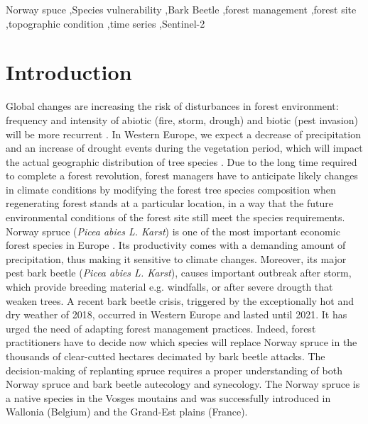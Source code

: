 \documentclass[3p,procedia]{elsarticle}
\begin{document}
\begin{frontmatter}
\begin{abstract}
\fi
\end{abstract}

\begin{keyword}
  Norway spuce \sep Species vulnerability \sep Bark Beetle \sep forest management \sep forest site \sep topographic condition \sep time series \sep Sentinel-2
\end{keyword}

\end{frontmatter}

\linenumbers

\section{Introduction}

Global changes are increasing the risk of disturbances in forest environment: frequency and intensity of abiotic (fire, storm, drough) and biotic (pest invasion) will be more recurrent \citep{lindner_climate_2010}.
In Western Europe, we expect a decrease of precipitation and an increase of drought events during the vegetation period, which will impact the actual geographic distribution of tree species \citep{hanewinkel2013climate}.
Due to the long time required to complete a forest revolution, forest managers have to anticipate likely changes in climate conditions by modifying the forest tree species composition when regenerating forest stands  at a particular location, in a way that the future environmental conditions of the forest site still meet the species requirements.
Norway spruce (\textit{Picea abies L. Karst}) is one of the most important economic forest species in Europe \citep{nystedt_norway_2013}.
Its productivity comes with a demanding amount of precipitation, thus making it sensitive to climate changes.
Moreover, its major pest bark beetle (\textit{Picea abies L. Karst}), causes important outbreak after storm, which provide breeding material e.g. windfalls, or after severe drougth that weaken trees.
A recent bark beetle crisis, triggered by the exceptionally hot and dry weather of 2018, occurred in Western Europe and lasted until 2021. 
It has urged the need of adapting forest management practices. 
Indeed, forest practitioners have to decide now which species will replace Norway spruce in the thousands of clear-cutted hectares decimated by bark beetle attacks. 
The decision-making of replanting spruce requires a proper understanding of both Norway spruce and bark beetle autecology and synecology.
The Norway spruce is a native species in the Vosges moutains and was successfully introduced in Wallonia (Belgium) and the Grand-Est plains (France).  
\end{document}
